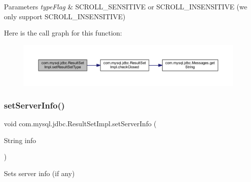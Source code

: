 \begin{DoxyParams}{Parameters}
{\em type\+Flag} & S\+C\+R\+O\+L\+L\+\_\+\+S\+E\+N\+S\+I\+T\+I\+VE or S\+C\+R\+O\+L\+L\+\_\+\+I\+N\+S\+E\+N\+S\+I\+T\+I\+VE (we only support S\+C\+R\+O\+L\+L\+\_\+\+I\+N\+S\+E\+N\+S\+I\+T\+I\+VE) \\
\hline
\end{DoxyParams}
Here is the call graph for this function\+:
\nopagebreak
\begin{figure}[H]
\begin{center}
\leavevmode
\includegraphics[width=350pt]{classcom_1_1mysql_1_1jdbc_1_1_result_set_impl_af96271eb91709c3bb9cd6d35b7b82617_cgraph}
\end{center}
\end{figure}
\mbox{\label{classcom_1_1mysql_1_1jdbc_1_1_result_set_impl_aeed7375a7fd914946480d5d1e51efa68}} 
\subsubsection{\texorpdfstring{set\+Server\+Info()}{setServerInfo()}}
{\footnotesize\ttfamily void com.\+mysql.\+jdbc.\+Result\+Set\+Impl.\+set\+Server\+Info (\begin{DoxyParamCaption}\item[{String}]{info }\end{DoxyParamCaption})\hspace{0.3cm}{\ttfamily [protected]}}

Sets server info (if any)


